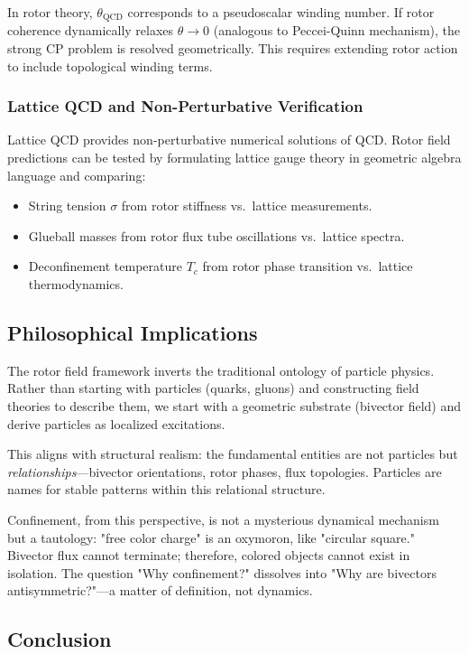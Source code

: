 \documentclass[11pt,a4paper]{article}
\theoremstyle{definition}
\theoremstyle{plain}
\theoremstyle{remark}
\begin{document}
In rotor theory, $\theta_{\mathrm{QCD}}$ corresponds to a pseudoscalar winding number. If rotor coherence dynamically relaxes $\theta \to 0$ (analogous to Peccei-Quinn mechanism), the strong CP problem is resolved geometrically. This requires extending rotor action to include topological winding terms.

\subsubsection{Lattice QCD and Non-Perturbative Verification}

Lattice QCD provides non-perturbative numerical solutions of QCD. Rotor field predictions can be tested by formulating lattice gauge theory in geometric algebra language and comparing:
\begin{itemize}
  \item String tension $\sigma$ from rotor stiffness vs.\ lattice measurements.
  \item Glueball masses from rotor flux tube oscillations vs.\ lattice spectra.
  \item Deconfinement temperature $T_c$ from rotor phase transition vs.\ lattice thermodynamics.
\end{itemize}

\subsection{Philosophical Implications}

The rotor field framework inverts the traditional ontology of particle physics. Rather than starting with particles (quarks, gluons) and constructing field theories to describe them, we start with a geometric substrate (bivector field) and derive particles as localized excitations.

This aligns with structural realism: the fundamental entities are not particles but \emph{relationships}---bivector orientations, rotor phases, flux topologies. Particles are names for stable patterns within this relational structure.

Confinement, from this perspective, is not a mysterious dynamical mechanism but a tautology: "free color charge" is an oxymoron, like "circular square." Bivector flux cannot terminate; therefore, colored objects cannot exist in isolation. The question "Why confinement?" dissolves into "Why are bivectors antisymmetric?"---a matter of definition, not dynamics.

\subsection{Conclusion}
\end{document}
